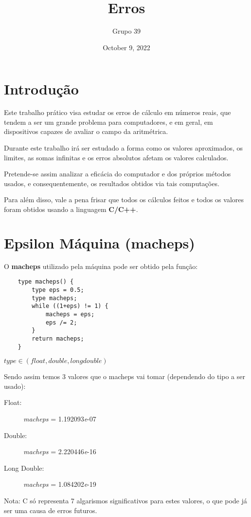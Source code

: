 \documentclass[12pt, letterpaper]{article}
\title{Erros}
\author{Grupo 39}
\date{October 9, 2022}
\begin{document}
\maketitle

\section*{Introdução}

Este trabalho prático visa estudar os erros de cálculo em números reais, que tendem a ser um grande problema para computadores, e em geral, em dispositivos capazes de avaliar o campo da aritmétrica.

Durante este trabalho irá ser estudado a forma como os valores aproximados, os limites, as somas infinitas e os erros absolutos afetam os valores calculados. 

Pretende-se assim analizar a eficácia do computador e dos próprios métodos usados, e consequentemente, os resultados obtidos via tais computações.

Para além disso, vale a pena frisar que todos os cálculos feitos e todos os valores foram obtidos usando a linguagem \textbf{C/C++}. 

\section*{Epsilon Máquina (macheps)}
O \textbf{macheps} utilizado pela máquina pode ser obtido pela função:
\begin{verbatim}
    type macheps() {
        type eps = 0.5;
        type macheps;
        while ((1+eps) != 1) {
            macheps = eps;
            eps /= 2;
        }
        return macheps;
    }
\end{verbatim}

$type \in (float, double, long double)$

Sendo assim temos 3 valores que o macheps vai tomar (dependendo do tipo a ser usado):

\begin{description}
    \item[Float:]\textit{macheps} = 1.192093\textit{e}-07
    \item[Double:]\textit{macheps} = 2.220446\textit{e}-16
    \item[Long Double:]\textit{macheps} = 1.084202\textit{e}-19
\end{description}

\small Nota: C só representa 7 algarismos significativos para estes valores, o que pode já ser uma causa de erros futuros.
\end{document}
